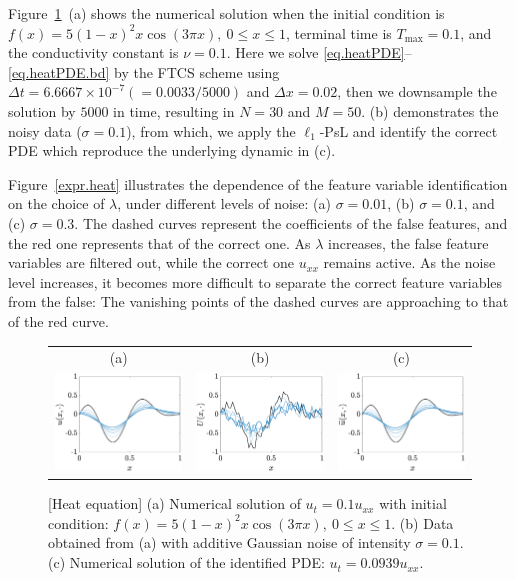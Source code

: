 \documentclass[a4paper,11pt]{article}
\begin{document}
Figure~\ref{fig.heat}~(a) shows the numerical solution when the initial condition is $f(x)=5(1-x)^2x\cos(3\pi x),~0\leq x\leq 1$, terminal time is $T_{\max}=0.1$, and the conductivity constant is $\nu =0.1$.  Here we solve \eqref{eq.heatPDE}--\eqref{eq.heatPDE.bd} by the FTCS scheme using $\Delta t=6.6667\times10^{-7} (=0.0033/5000)$ and $\Delta x= 0.02$, then we downsample the solution by $5000$ in time, resulting in $N=30$ and $M=50$. (b) demonstrates the noisy data ($\sigma=0.1$), from which, we apply the $\ell_1$-PsL and identify the correct PDE which reproduce the underlying dynamic in (c).

Figure~\ref{expr.heat} illustrates the dependence of the feature variable identification on the choice of $\lambda$, under different levels of noise: (a) $\sigma=0.01$, (b) $\sigma=0.1$, and (c) $\sigma=0.3$. The dashed curves represent  the coefficients of the false features, and the red one represents that of the correct one.  As $\lambda$ increases, the false feature variables are filtered out, while the correct one $u_{xx}$ remains active. As the noise level increases, it becomes more difficult to separate the correct feature variables from the false: The vanishing points of the dashed curves are approaching to that of the red curve. 
\begin{figure}
\centering
\begin{tabular}{ccc}
(a)&(b)&(c)\\
\includegraphics[width=2in]{Figures/heat_sol.eps}&
\includegraphics[width=2in]{Figures/heat_noise.eps}&
\includegraphics[width=2in]{Figures/heat_resimu.eps}
\end{tabular}
\caption{[Heat equation] (a) Numerical solution of $u_t=0.1u_{xx}$ with initial condition: $f(x)=5(1-x)^2x\cos(3\pi x),~0\leq x\leq 1$. (b) Data obtained from (a) with additive Gaussian noise of intensity $\sigma=0.1$. (c) Numerical solution of the identified PDE: $u_t=0.0939u_{xx}$. }	\label{fig.heat}
\end{figure}
\end{document}
